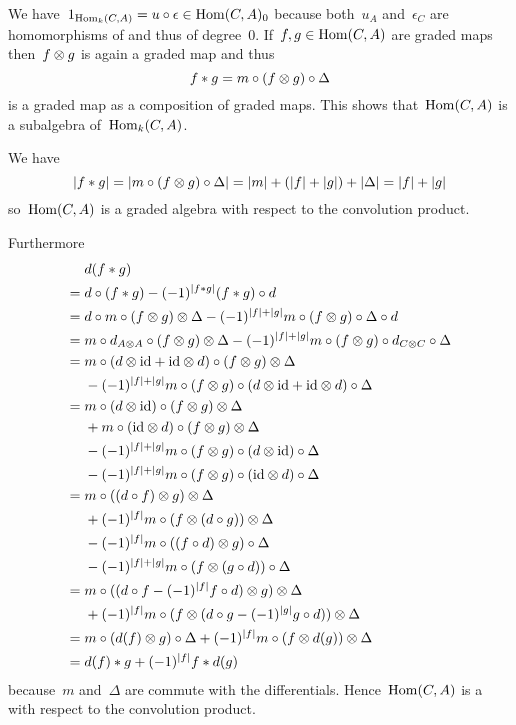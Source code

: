 We have~$1_{\operatorname{Hom}_k(C,A)} = u \circ \epsilon \in \operatorname{Hom}(C,A)_0$ because both~$u_A$ and~$\epsilon_C$ are homomorphisms of {\dgvs} and thus of degree~$0$.
If~$f, g \in \operatorname{Hom}(C,A)$ are graded maps then~$f \otimes g$ is again a graded map and thus
\[
  f * g
  =
  m \circ (f \otimes g) \circ \Delta
\]
is a graded map as a composition of graded maps.
This shows that~$\operatorname{Hom}(C,A)$ is a subalgebra of~$\operatorname{Hom}_k(C,A)$.

We have
\[
  \lvert f * g\rvert
  =
  \lvert m \circ (f \otimes g) \circ \Delta\rvert
  =
  \lvert m\rvert + (\lvert f\rvert + \lvert g\rvert) + \lvert\Delta\rvert
  =
  \lvert f\rvert + \lvert g\rvert
\]
so~$\operatorname{Hom}(C,A)$ is a graded algebra with respect to the convolution product.

Furthermore
\begingroup
\allowdisplaybreaks
\begin{align*}
  {}&
  d(f * g)
  \\
  ={}&
  d \circ (f * g)
  -
  (-1)^{\lvert f * g\rvert} (f * g) \circ d
  \\
  ={}&
  d \circ m \circ (f \otimes g) \otimes \Delta
  -
  (-1)^{\lvert f\rvert + \lvert g\rvert}
  m \circ (f \otimes g) \circ \Delta \circ d
  \\
  ={}&
  m \circ d_{A \otimes A} \circ (f \otimes g) \otimes \Delta
  -
  (-1)^{\lvert f\rvert + \lvert g\rvert}
  m \circ (f \otimes g) \circ d_{C \otimes C} \circ \Delta
  \\
  ={}&
  m \circ (d \otimes {\operatorname{id}} + {\operatorname{id}} \otimes d) \circ (f \otimes g) \otimes \Delta
  \\
  {}&
  -
  (-1)^{\lvert f\rvert + \lvert g\rvert}
  m \circ (f \otimes g) \circ (d \otimes {\operatorname{id}} + {\operatorname{id}} \otimes d) \circ \Delta
  \\
  ={}&
    m \circ (d \otimes {\operatorname{id}}) \circ (f \otimes g) \otimes \Delta
  \\
  {}&
  + m \circ ({\operatorname{id}} \otimes d) \circ (f \otimes g) \otimes \Delta
  \\
  {}&
  - (-1)^{\lvert f\rvert + \lvert g\rvert} m \circ (f \otimes g) \circ (d \otimes {\operatorname{id}}) \circ \Delta
  \\
  {}&
  - (-1)^{\lvert f\rvert + \lvert g\rvert} m \circ (f \otimes g) \circ ({\operatorname{id}} \otimes d) \circ \Delta
  \\
  ={}&
    m \circ ((d \circ f) \otimes g) \otimes \Delta
  \\
  {}&
  + (-1)^{\lvert f\rvert} m \circ (f \otimes (d \circ g)) \otimes \Delta
  \\
  {}&
  - (-1)^{\lvert f\rvert} m \circ ((f \circ d) \otimes g) \circ \Delta
  \\
  {}&
  - (-1)^{\lvert f\rvert + \lvert g\rvert} m \circ (f \otimes (g \circ d))\circ \Delta
  \\
  ={}&
    m \circ ((d \circ f - (-1)^{\lvert f\rvert} f \circ d) \otimes g) \otimes \Delta
  \\
  {}&
  + (-1)^{\lvert f\rvert} m \circ (f \otimes (d \circ g - (-1)^{\lvert g\rvert} g \circ d)) \otimes \Delta
  \\
  ={}&
    m \circ (d(f) \otimes g) \circ \Delta
  + (-1)^{\lvert f\rvert} m \circ (f \otimes d(g)) \otimes \Delta
  \\
  ={}&
  d(f) * g + (-1)^{\lvert f\rvert} f * d(g)
\end{align*}
\endgroup
because~$m$ and~$\Delta$ are commute with the differentials.
Hence~$\operatorname{Hom}(C,A)$ is a {\dga} with respect to the convolution product.

